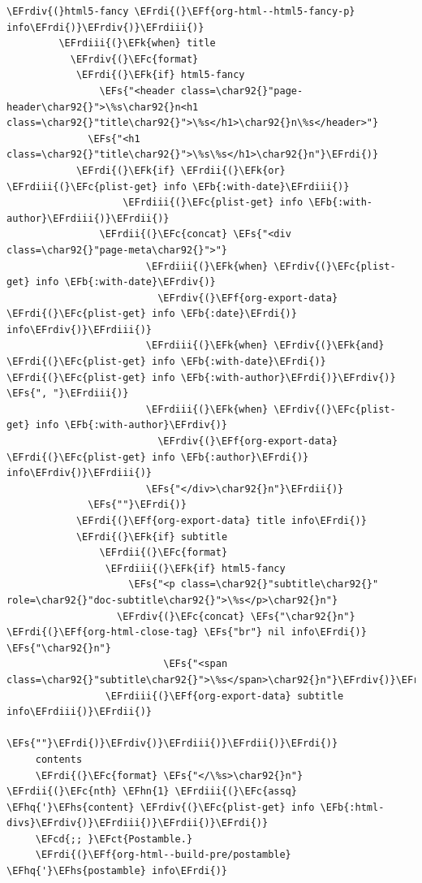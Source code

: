 \documentclass{scrartcl}
\newcommand{\EFk}[1]{\textcolor{EFk}{#1}} %
\newcommand{\EFs}[1]{\textcolor{EFs}{#1}} %
\newcommand{\EFb}[1]{\textcolor{EFb}{#1}} %
\newcommand{\EFct}[1]{\textcolor{EFct}{#1}} %
\newcommand{\EFc}[1]{\textcolor{EFc}{#1}} %
\newcommand{\EFf}[1]{\textcolor{EFf}{#1}} %
\newcommand{\EFcd}[1]{\textcolor{EFcd}{#1}} %
\newcommand{\EFhn}[1]{#1} %
\newcommand{\EFhq}[1]{#1} %
\newcommand{\EFhs}[1]{#1} %
\newcommand{\EFrdi}[1]{#1} %
\newcommand{\EFrdii}[1]{#1} %
\newcommand{\EFrdiii}[1]{#1} %
\newcommand{\EFrdiv}[1]{#1} %
\begin{document}
\begin{Code}
\begin{Verbatim}[]
             \EFrdiv{(}html5-fancy \EFrdi{(}\EFf{org-html--html5-fancy-p} info\EFrdi{)}\EFrdiv{)}\EFrdiii{)}
         \EFrdiii{(}\EFk{when} title
           \EFrdiv{(}\EFc{format}
            \EFrdi{(}\EFk{if} html5-fancy
                \EFs{"<header class=\char92{}"page-header\char92{}">\%s\char92{}n<h1 class=\char92{}"title\char92{}">\%s</h1>\char92{}n\%s</header>"}
              \EFs{"<h1 class=\char92{}"title\char92{}">\%s\%s</h1>\char92{}n"}\EFrdi{)}
            \EFrdi{(}\EFk{if} \EFrdii{(}\EFk{or} \EFrdiii{(}\EFc{plist-get} info \EFb{:with-date}\EFrdiii{)}
                    \EFrdiii{(}\EFc{plist-get} info \EFb{:with-author}\EFrdiii{)}\EFrdii{)}
                \EFrdii{(}\EFc{concat} \EFs{"<div class=\char92{}"page-meta\char92{}">"}
                        \EFrdiii{(}\EFk{when} \EFrdiv{(}\EFc{plist-get} info \EFb{:with-date}\EFrdiv{)}
                          \EFrdiv{(}\EFf{org-export-data} \EFrdi{(}\EFc{plist-get} info \EFb{:date}\EFrdi{)} info\EFrdiv{)}\EFrdiii{)}
                        \EFrdiii{(}\EFk{when} \EFrdiv{(}\EFk{and} \EFrdi{(}\EFc{plist-get} info \EFb{:with-date}\EFrdi{)} \EFrdi{(}\EFc{plist-get} info \EFb{:with-author}\EFrdi{)}\EFrdiv{)} \EFs{", "}\EFrdiii{)}
                        \EFrdiii{(}\EFk{when} \EFrdiv{(}\EFc{plist-get} info \EFb{:with-author}\EFrdiv{)}
                          \EFrdiv{(}\EFf{org-export-data} \EFrdi{(}\EFc{plist-get} info \EFb{:author}\EFrdi{)} info\EFrdiv{)}\EFrdiii{)}
                        \EFs{"</div>\char92{}n"}\EFrdii{)}
              \EFs{""}\EFrdi{)}
            \EFrdi{(}\EFf{org-export-data} title info\EFrdi{)}
            \EFrdi{(}\EFk{if} subtitle
                \EFrdii{(}\EFc{format}
                 \EFrdiii{(}\EFk{if} html5-fancy
                     \EFs{"<p class=\char92{}"subtitle\char92{}" role=\char92{}"doc-subtitle\char92{}">\%s</p>\char92{}n"}
                   \EFrdiv{(}\EFc{concat} \EFs{"\char92{}n"} \EFrdi{(}\EFf{org-html-close-tag} \EFs{"br"} nil info\EFrdi{)} \EFs{"\char92{}n"}
                           \EFs{"<span class=\char92{}"subtitle\char92{}">\%s</span>\char92{}n"}\EFrdiv{)}\EFrdiii{)}
                 \EFrdiii{(}\EFf{org-export-data} subtitle info\EFrdiii{)}\EFrdii{)}
              \EFs{""}\EFrdi{)}\EFrdiv{)}\EFrdiii{)}\EFrdii{)}\EFrdi{)}
     contents
     \EFrdi{(}\EFc{format} \EFs{"</\%s>\char92{}n"} \EFrdii{(}\EFc{nth} \EFhn{1} \EFrdiii{(}\EFc{assq} \EFhq{'}\EFhs{content} \EFrdiv{(}\EFc{plist-get} info \EFb{:html-divs}\EFrdiv{)}\EFrdiii{)}\EFrdii{)}\EFrdi{)}
     \EFcd{;; }\EFct{Postamble.}
     \EFrdi{(}\EFf{org-html--build-pre/postamble} \EFhq{'}\EFhs{postamble} info\EFrdi{)}

\end{Verbatim}
\end{Code}
\end{document}
